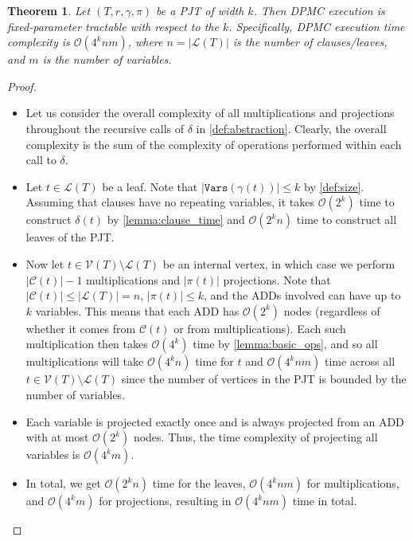 \documentclass{article}
\newtheorem{theorem}{Theorem}
\theoremstyle{definition}
\theoremstyle{remark}
\begin{document}
\begin{theorem}
  Let $(T, r, \gamma, \pi)$ be a PJT of width $k$. Then \textsc{DPMC} execution
  is fixed-parameter tractable with respect to the $k$. Specifically,
  \textsc{DPMC} execution time complexity is $\mathcal{O}(4^knm)$, where $n
  = |\mathcal{L}(T)|$ is the number of clauses/leaves, and $m$ is the number of
  variables.
\end{theorem}
\begin{proof}
  \begin{itemize}
  \item Let us consider the overall complexity of all multiplications and
    projections throughout the recursive calls of $\delta$ in
    \cref{def:abstraction}. Clearly, the overall complexity is the sum of the
    complexity of operations performed within each call to $\delta$.
  \item Let $t \in \mathcal{L}(T)$ be a leaf. Note that
    $|\mathtt{Vars}(\gamma(t))| \le k$ by \cref{def:size}. Assuming that clauses
    have no repeating variables, it takes $\mathcal{O}(2^k)$ time to construct
    $\delta(t)$ by \cref{lemma:clause_time} and $\mathcal{O}(2^kn)$ time to
    construct all leaves of the PJT.
  \item Now let $t \in \mathcal{V}(T) \setminus \mathcal{L}(T)$ be an internal
    vertex, in which case we perform $|\mathcal{C}(t)|-1$ multiplications and
    $|\pi(t)|$ projections. Note that $|\mathcal{C}(t)| \le |\mathcal{L}(T)| =
    n$, $|\pi(t)| \le k$, and the ADDs involved can have up to $k$ variables.
    This means that each ADD has $\mathcal{O}(2^k)$ nodes (regardless of whether
    it comes from $\mathcal{C}(t)$ or from multiplications). Each such
    multiplication then takes $\mathcal{O}(4^k)$ time by \cref{lemma:basic_ops},
    and so all multiplications will take $\mathcal{O}(4^kn)$ time for $t$ and
    $\mathcal{O}(4^knm)$ time across all $t \in \mathcal{V}(T) \setminus
    \mathcal{L}(T)$ since the number of vertices in the PJT is bounded by the
    number of variables.
  \item Each variable is projected exactly once and is always projected from
    an ADD with at most $\mathcal{O}(2^k)$ nodes. Thus, the time complexity of
    projecting all variables is $\mathcal{O}(4^km)$.
  \item In total, we get $\mathcal{O}(2^kn)$ time for the leaves,
    $\mathcal{O}(4^knm)$ for multiplications, and $\mathcal{O}(4^km)$ for
    projections, resulting in $\mathcal{O}(4^knm)$ time in total.
  \end{itemize}
\end{proof}



\end{document}
